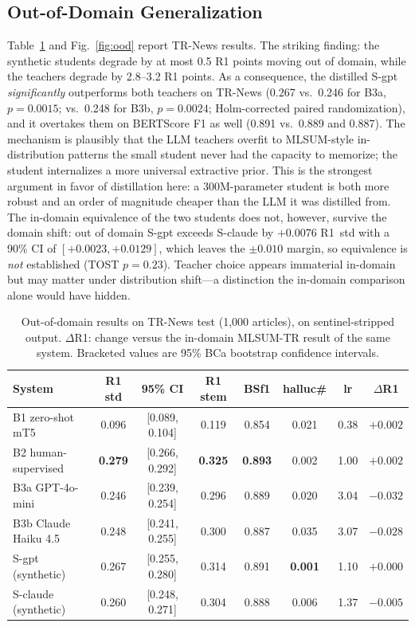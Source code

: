 \documentclass[conference]{IEEEtran}
\begin{document}
\subsection{Out-of-Domain Generalization}
Table~\ref{tab:ood} and Fig.~\ref{fig:ood} report TR-News results. The striking finding: the synthetic students degrade by at most 0.5 R1 points moving out of domain, while the teachers degrade by 2.8--3.2 R1 points. As a consequence, the distilled S-gpt \emph{significantly} outperforms both teachers on TR-News (0.267 vs.\ 0.246 for B3a, $p{=}0.0015$; vs.\ 0.248 for B3b, $p{=}0.0024$; Holm-corrected paired randomization), and it overtakes them on BERTScore F1 as well (0.891 vs.\ 0.889 and 0.887). The mechanism is plausibly that the LLM teachers overfit to MLSUM-style in-distribution patterns the small student never had the capacity to memorize; the student internalizes a more universal extractive prior. This is the strongest argument in favor of distillation here: a 300M-parameter student is both more robust and an order of magnitude cheaper than the LLM it was distilled from. The in-domain equivalence of the two students does not, however, survive the domain shift: out of domain S-gpt exceeds S-claude by $+0.0076$ R1~std with a 90\% CI of $[+0.0023,+0.0129]$, which leaves the $\pm0.010$ margin, so equivalence is \emph{not} established (TOST $p{=}0.23$). Teacher choice appears immaterial in-domain but may matter under distribution shift---a distinction the in-domain comparison alone would have hidden.

\begin{table}[t]
\centering
\caption{Out-of-domain results on TR-News test (1{,}000 articles), on sentinel-stripped output. $\Delta$R1: change versus the in-domain MLSUM-TR result of the same system. Bracketed values are 95\% BCa bootstrap confidence intervals.}
\label{tab:ood}
\footnotesize
\setlength{\tabcolsep}{3pt}
\begin{tabular}{lccccccc}
\toprule
System & R1 std & 95\% CI & R1 stem & BSf1 & halluc\# & lr & $\Delta$R1 \\
\midrule
B1 zero-shot mT5    & 0.096 & [0.089, 0.104] & 0.119 & 0.854 & 0.021 & 0.38 & $+0.002$ \\
B2 human-supervised & \textbf{0.279} & [0.266, 0.292] & \textbf{0.325} & \textbf{0.893} & 0.002 & 1.00 & $+0.002$ \\
B3a GPT-4o-mini     & 0.246 & [0.239, 0.254] & 0.296 & 0.889 & 0.020 & 3.04 & $-0.032$ \\
B3b Claude Haiku 4.5 & 0.248 & [0.241, 0.255] & 0.300 & 0.887 & 0.035 & 3.07 & $-0.028$ \\
S-gpt (synthetic)   & 0.267 & [0.255, 0.280] & 0.314 & 0.891 & \textbf{0.001} & 1.10 & $+0.000$ \\
S-claude (synthetic) & 0.260 & [0.248, 0.271] & 0.304 & 0.888 & 0.006 & 1.37 & $-0.005$ \\
\bottomrule
\end{tabular}
\end{table}
\end{document}
